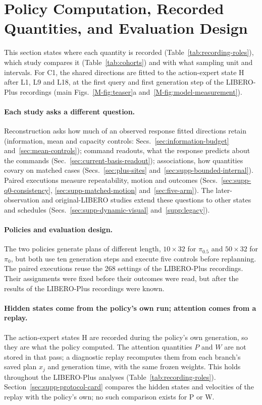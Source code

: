 \section{Policy Computation, Recorded Quantities, and Evaluation Design}
\label{supp:recording-overview}
This section states where each quantity is recorded (Table~\ref{tab:recording-roles}), which study compares it (Table~\ref{tab:cohorts}) and with what sampling unit and intervals. For C1, the shared directions are fitted to the action-expert state H after L1, L9 and L18, at the first query and first generation step of the LIBERO-Plus recordings (main Figs.~\ref{M-fig:teaser}a and~\ref{M-fig:model-measurement}).

\paragraph{Each study asks a different question.}
Reconstruction asks how much of an observed response fitted directions retain (information, mean and capacity controls: Secs.~\ref{sec:information-budget} and~\ref{sec:mean-controls}); command readouts, what the response predicts about the commands (Sec.~\ref{sec:current-basis-readout}); associations, how quantities covary on matched cases (Secs.~\ref{sec:plus-sites} and~\ref{sec:supp-bounded-internal}). Paired executions measure repeatability, motion and outcomes (Secs.~\ref{sec:supp-q0-consistency}, \ref{sec:supp-matched-motion} and~\ref{sec:five-arm}). The later-observation and original-LIBERO studies extend these questions to other states and schedules (Secs.~\ref{sec:supp-dynamic-visual} and~\ref{supp:legacy}).

\paragraph{Policies and evaluation design.}
The two policies generate plans of different length, $10\times32$ for $\pi_{0.5}$ and $50\times32$ for $\pi_0$, but both use ten generation steps and execute five controls before replanning. The paired executions reuse the 268 settings of the LIBERO-Plus recordings. Their assignments were fixed before their outcomes were read, but after the results of the LIBERO-Plus recordings were known.

\paragraph{Hidden states come from the policy's own run; attention comes from a replay.}
The action-expert states H are recorded during the policy's own generation, so they are what the policy computed. The attention quantities $P$ and $W$ are not stored in that pass; a diagnostic replay recomputes them from each branch's saved plan $x_j$ and generation time, with the same frozen weights. This holds throughout the LIBERO-Plus analyses (Table~\ref{tab:recording-roles}). Section~\ref{sec:supp-protocol-card} compares the hidden states and velocities of the replay with the policy's own; no such comparison exists for P or W.

